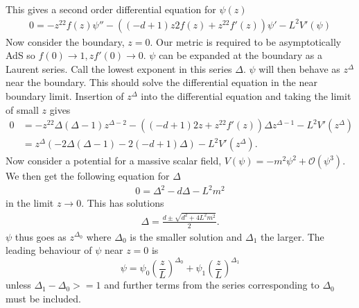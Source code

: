 \documentclass[12pt]{report}
\begin{document}
This gives a second order differential equation for $\psi(z)$
\begin{equation}
\begin{split}
0=-z^22f(z)\psi''-\left((-d+1)z2f(z) + z^22f'(z)\right)\psi' -L^2V'(\psi)
\end{split}
\end{equation}
Now consider the boundary, $z=0$. Our metric is required to be asymptotically AdS so $f(0)\rightarrow1, zf'(0)\rightarrow0$. $\psi$ can be expanded at the boundary as a Laurent series. Call the lowest exponent in this series $\Delta$. $\psi$ will then behave as $z^\Delta$ near the boundary. This should solve the differential equation in the near boundary limit. Insertion of $z^\Delta$ into the differential equation and taking the limit of small $z$ gives
\begin{equation}
\begin{split}
0&=-z^22\Delta(\Delta-1)z^{\Delta-2}-\left((-d+1)2z + z^22f'(z)\right)\Delta z^{\Delta-1} -L^2V'(z^{\Delta})\\
&=z^{\Delta}\left(-2\Delta(\Delta-1)-2(-d+1)\Delta\right)-L^2V'(z^{\Delta}).
\end{split}
\end{equation}
Now consider a potential for a massive scalar field, $V(\psi)=-m^2\psi^2+\mathcal{O}(\psi^3)$. We then get the following equation for $\Delta$
\begin{equation}
\begin{split}
0=\Delta^2-d\Delta-L^2m^2
\end{split}
\end{equation}
in the limit $z\rightarrow0$. This has solutions
\begin{equation}
\begin{split}
\Delta=\frac{d\pm\sqrt{d^2+4L^2m^2}}{2}.
\end{split}
\end{equation}
$\psi$ thus goes as $z^{\Delta_0}$ where $\Delta_0$ is the smaller solution and $\Delta_1$ the larger. The leading behaviour of $\psi$ near $z=0$ is
\begin{equation}
 \psi=\psi_0\left(\frac{z}{L}\right)^{\Delta_0}+\psi_1\left(\frac{z}{L}\right)^{\Delta_1}
\end{equation}
unless $\Delta_1-\Delta_0>=1$ and further terms from the series corresponding to $\Delta_0$ must be included.\\
\end{document}
